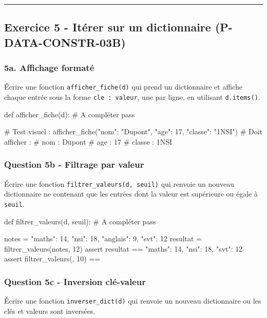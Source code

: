 \begin{center}\rule{0.5\linewidth}{0.5pt}\end{center}

\subsection{Exercice 5 - Itérer sur un dictionnaire (P-DATA-CONSTR-03B)}

\subsubsection{5a. Affichage formaté}

Écrire une fonction \texttt{afficher\_fiche(d)} qui prend un
dictionnaire et affiche chaque entrée sous la forme
\texttt{cle\ :\ valeur}, une par ligne, en utilisant \texttt{d.items()}.

\begin{python}
def afficher_fiche(d):
    # A compléter
    pass

# Test visuel :
afficher_fiche({"nom": "Dupont", "age": 17, "classe": "1NSI"})
# Doit afficher :
# nom : Dupont
# age : 17
# classe : 1NSI
\end{python}

\subsubsection{Question 5b - Filtrage par valeur}

Écrire une fonction \texttt{filtrer\_valeurs(d,\ seuil)} qui renvoie un
nouveau dictionnaire ne contenant que les entrées dont la valeur est
supérieure ou égale à \texttt{seuil}.

\begin{python}
def filtrer_valeurs(d, seuil):
    # A compléter
    pass

notes = {"maths": 14, "nsi": 18, "anglais": 9, "svt": 12}
resultat = filtrer_valeurs(notes, 12)
assert resultat == {"maths": 14, "nsi": 18, "svt": 12}
assert filtrer_valeurs({}, 10) == {}
\end{python}

\subsubsection{Question 5c - Inversion clé-valeur}

Écrire une fonction \texttt{inverser\_dict(d)} qui renvoie un nouveau
dictionnaire ou les clés et valeurs sont inversées.

